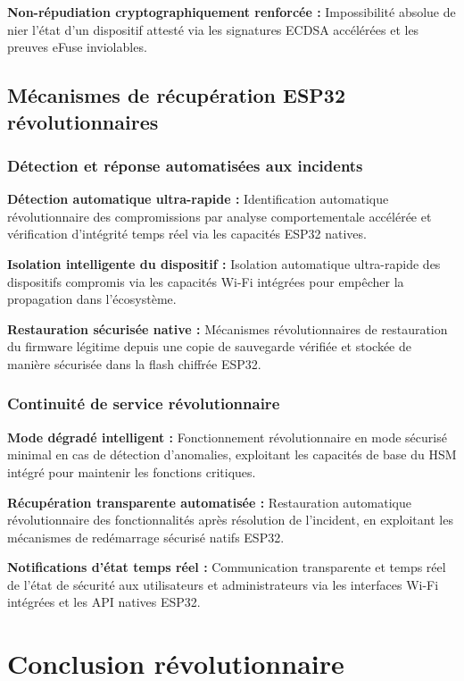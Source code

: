\begin{algorithm}
\textbf{Non-répudiation cryptographiquement renforcée :} Impossibilité absolue de nier l'état d'un dispositif attesté via les signatures ECDSA accélérées et les preuves eFuse inviolables.

\subsection{Mécanismes de récupération ESP32 révolutionnaires}

\subsubsection{Détection et réponse automatisées aux incidents}

\textbf{Détection automatique ultra-rapide :} Identification automatique révolutionnaire des compromissions par analyse comportementale accélérée et vérification d'intégrité temps réel via les capacités ESP32 natives.

\textbf{Isolation intelligente du dispositif :} Isolation automatique ultra-rapide des dispositifs compromis via les capacités Wi-Fi intégrées pour empêcher la propagation dans l'écosystème.

\textbf{Restauration sécurisée native :} Mécanismes révolutionnaires de restauration du firmware légitime depuis une copie de sauvegarde vérifiée et stockée de manière sécurisée dans la flash chiffrée ESP32.

\subsubsection{Continuité de service révolutionnaire}

\textbf{Mode dégradé intelligent :} Fonctionnement révolutionnaire en mode sécurisé minimal en cas de détection d'anomalies, exploitant les capacités de base du HSM intégré pour maintenir les fonctions critiques.

\textbf{Récupération transparente automatisée :} Restauration automatique révolutionnaire des fonctionnalités après résolution de l'incident, en exploitant les mécanismes de redémarrage sécurisé natifs ESP32.

\textbf{Notifications d'état temps réel :} Communication transparente et temps réel de l'état de sécurité aux utilisateurs et administrateurs via les interfaces Wi-Fi intégrées et les API natives ESP32.

\section{Conclusion révolutionnaire}


\end{algorithm}
